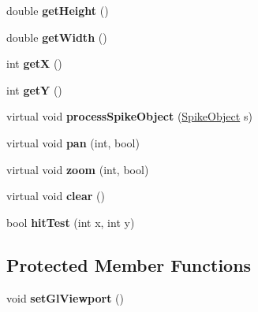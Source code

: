 \begin{DoxyCompactItemize}
\item 
\hypertarget{classBaseUIElement_a8f8022d087c697c5a04c10417ea1ca20}{double {\bfseries get\-Height} ()}\label{classBaseUIElement_a8f8022d087c697c5a04c10417ea1ca20}

\item 
\hypertarget{classBaseUIElement_ae32de848136eca61c71830aa8b48ed95}{double {\bfseries get\-Width} ()}\label{classBaseUIElement_ae32de848136eca61c71830aa8b48ed95}

\item 
\hypertarget{classBaseUIElement_a74aa4569d1c6e3edbad13b7f29de8d56}{int {\bfseries get\-X} ()}\label{classBaseUIElement_a74aa4569d1c6e3edbad13b7f29de8d56}

\item 
\hypertarget{classBaseUIElement_a6e512068c7a0b1c0aa6b1e04bd72d5a7}{int {\bfseries get\-Y} ()}\label{classBaseUIElement_a6e512068c7a0b1c0aa6b1e04bd72d5a7}

\item 
\hypertarget{classBaseUIElement_a20e0a11922c3290dc85e64e13fa86b65}{virtual void {\bfseries process\-Spike\-Object} (\hyperlink{structSpikeObject}{Spike\-Object} s)}\label{classBaseUIElement_a20e0a11922c3290dc85e64e13fa86b65}

\item 
\hypertarget{classBaseUIElement_a80bf90bc03c8c39f71b523f7f5735ab0}{virtual void {\bfseries pan} (int, bool)}\label{classBaseUIElement_a80bf90bc03c8c39f71b523f7f5735ab0}

\item 
\hypertarget{classBaseUIElement_ab3777efcbb469ba0050f1cdd9fcfc1f1}{virtual void {\bfseries zoom} (int, bool)}\label{classBaseUIElement_ab3777efcbb469ba0050f1cdd9fcfc1f1}

\item 
\hypertarget{classBaseUIElement_a5c498c11811c0ef30e7dce0cf71dd386}{virtual void {\bfseries clear} ()}\label{classBaseUIElement_a5c498c11811c0ef30e7dce0cf71dd386}

\item 
\hypertarget{classBaseUIElement_aa064979e30e4573dd5d477e2dda0cbd7}{bool {\bfseries hit\-Test} (int x, int y)}\label{classBaseUIElement_aa064979e30e4573dd5d477e2dda0cbd7}

\end{DoxyCompactItemize}
\subsection*{Protected Member Functions}
\begin{DoxyCompactItemize}
\item 
\hypertarget{classBaseUIElement_a01f712833dbbdfc29fc8614eb34e79e5}{void {\bfseries set\-Gl\-Viewport} ()}\label{classBaseUIElement_a01f712833dbbdfc29fc8614eb34e79e5}

\end{DoxyCompactItemize}
